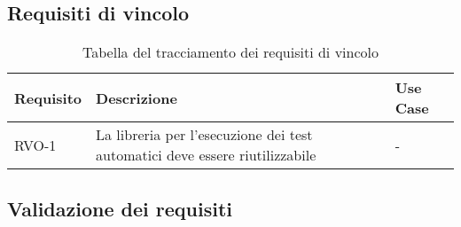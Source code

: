 \subsection{Requisiti di vincolo}

\begin{table}%
\caption{Tabella del tracciamento dei requisiti di vincolo}
\label{tab:requisiti-vincolo}
\begin{tabularx}{\textwidth}{lXl}
\hline\hline
\textbf{Requisito} & \textbf{Descrizione} & \textbf{Use Case}\\
\hline
RVO-1    & La libreria per l'esecuzione dei test automatici deve essere riutilizzabile & - \\
\hline
\end{tabularx}
\end{table}%

\subsection{Validazione dei requisiti}